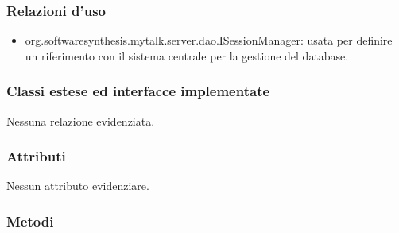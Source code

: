 \subsubsection*{Relazioni d'uso}

\begin{itemize}
		\item{org.softwaresynthesis.mytalk.server.dao.ISessionManager}: usata per definire un riferimento con il sistema centrale per la gestione del database.
\end{itemize}

\subsubsection*{Classi estese ed interfacce implementate}

Nessuna relazione evidenziata.

\subsubsection*{Attributi}

Nessun attributo evidenziare.

\subsubsection*{Metodi}

